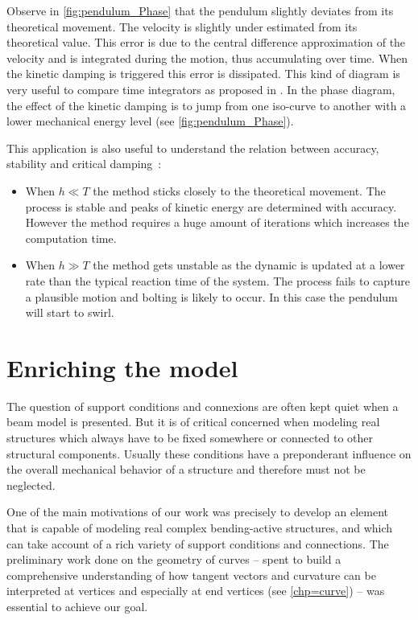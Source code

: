 Observe in \cref{fig:pendulum_Phase} that the pendulum slightly deviates from its theoretical movement. The velocity is slightly under estimated from its theoretical value. This error is due to the central difference approximation of the velocity and is integrated during the motion, thus accumulating over time. When the kinetic damping is triggered this error is dissipated. This kind of diagram is very useful to compare time integrators as proposed in \cite{Hairer2006}. In the phase diagram, the effect of the kinetic damping is to jump from one iso-curve to another with a lower mechanical energy level (see \cref{fig:pendulum_Phase}).

This application is also useful to understand the relation between accuracy, stability and critical damping~:
\begin{itemize}
\item When $h \ll T$ the method sticks closely to the theoretical movement. The process is stable and peaks of kinetic energy are determined with accuracy. However the method requires a huge amount of iterations which increases the computation time.
\item When $h \gg T$ the method gets unstable as the dynamic is updated at a lower rate than the typical reaction time of the system. The process fails to capture a plausible motion and bolting is likely to occur. In this case the pendulum will start to swirl.
\end{itemize}


\section{Enriching the model}\label{sec=enriching}

The question of support conditions and connexions are often kept quiet when a beam model is presented. But it is of critical concerned when modeling real structures which always have to be fixed somewhere or connected to other structural components. Usually these conditions have a preponderant influence on the overall mechanical behavior of a structure and therefore must not be neglected.

One of the main motivations of our work was precisely to develop an element that is capable of modeling real complex bending-active structures, and which can take account of a rich variety of support conditions and connections. The preliminary work done on the geometry of curves -- spent to build a comprehensive understanding of how tangent vectors and curvature can be interpreted at vertices and especially at end vertices (see \cref{chp=curve}) -- was essential to achieve our goal.

